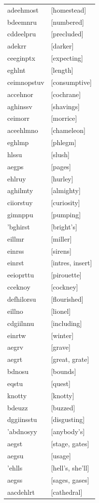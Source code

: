 \documentclass{article}
\begin{document}
\begin{tabular}{ll}
adeehmost & [homestead] \\
bdeemnru & [numbered] \\
cddeelpru & [precluded] \\
adekrr & [darker] \\
ceeginptx & [expecting] \\
eghlnt & [length] \\
ceimnopstuv & [consumptive] \\
accehnor & [cochrane] \\
aghinssv & [shavings] \\
ceimorr & [morrice] \\
aceehlmno & [chameleon] \\
eghlmp & [phlegm] \\
hlssu & [slush] \\
aegps & [pages] \\
ehlruy & [hurley] \\
aghilmty & [almighty] \\
ciiorstuy & [curiosity] \\
gimnppu & [pumping] \\
'bghirst & [bright's] \\
eillmr & [miller] \\
einrss & [sirens] \\
einrst & [intres, insert] \\
eeioprttu & [pirouette] \\
cceknoy & [cockney] \\
defhilorsu & [flourished] \\
eillno & [lionel] \\
cdgiilnnu & [including] \\
einrtw & [winter] \\
aegrv & [grave] \\
aegrt & [great, grate] \\
bdnosu & [bounds] \\
eqstu & [quest] \\
knotty & [knotty] \\
bdeuzz & [buzzed] \\
dggiinsstu & [disgusting] \\
'abdnosyy & [anybody's] \\
aegst & [stage, gates] \\
aegsu & [usage] \\
'ehlls & [hell's, she'll] \\
aegss & [sages, gases] \\
aacdehlrt & [cathedral] \\

\end{tabular}
\end{document}

